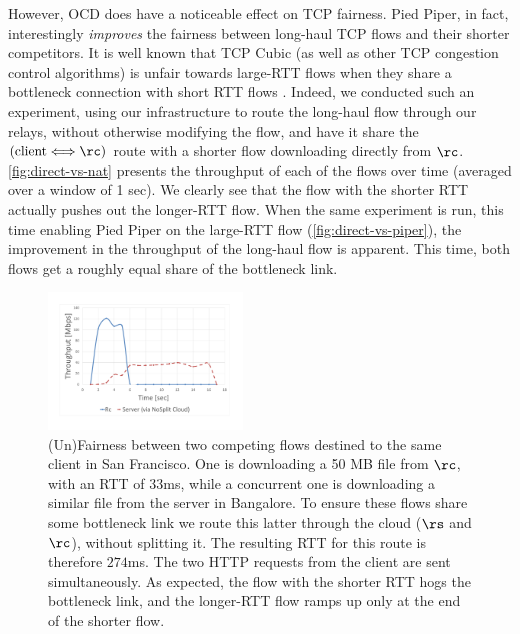 \documentclass[newfonts=false,format=sigconf,10pt,letterpaper]{acmart}
\newcommand{\name}{Pied Piper\xspace}
\begin{document}
However, OCD does have a noticeable effect on TCP fairness. \name, in fact, interestingly \textit{improves} the fairness between long-haul TCP flows and their shorter competitors.
It is well known that TCP Cubic (as well as other TCP congestion control algorithms) is unfair towards large-RTT flows when they share a bottleneck connection with short RTT flows \cite{kelly2001mathematical}. Indeed, we conducted such an experiment, using our infrastructure to route the long-haul flow through our relays, without otherwise modifying the flow, and have it share the $(\mbox{client}\Longleftrightarrow\rc)$ route with a shorter flow downloading directly from $\rc$.
\autoref{fig:direct-vs-nat} presents the throughput of each of the flows over time (averaged over a window of 1 sec). We clearly see that the flow with the shorter RTT actually pushes out the longer-RTT flow. When the same experiment is run, this time enabling \name on the large-RTT flow (\autoref{fig:direct-vs-piper}), the improvement in the throughput of the long-haul flow is apparent. This time, both flows get a roughly equal share of the bottleneck link.
 
\begin{figure}[!t]
  \centering
    \includegraphics[width=0.46\textwidth,trim=20mm 25mm 25mm 20mm,clip]{figures/DirectVsNAT.pdf}
    \caption{ (Un)Fairness between two competing flows destined to the same client in San Francisco. One is downloading a 50 MB file from $\rc$, with an RTT of $33$ms, while a concurrent one is downloading a similar file from the server in Bangalore. To ensure these flows share some bottleneck link we route this latter through the cloud ($\rs$ and $\rc$), without splitting it. The resulting RTT for this route is therefore $274$ms. The two HTTP requests from the client are sent simultaneously. As expected, the flow with the shorter RTT hogs the bottleneck link, and the longer-RTT flow ramps up only at the end of the shorter flow.
    }
    \label{fig:direct-vs-nat}
\end{figure}
\end{document}
